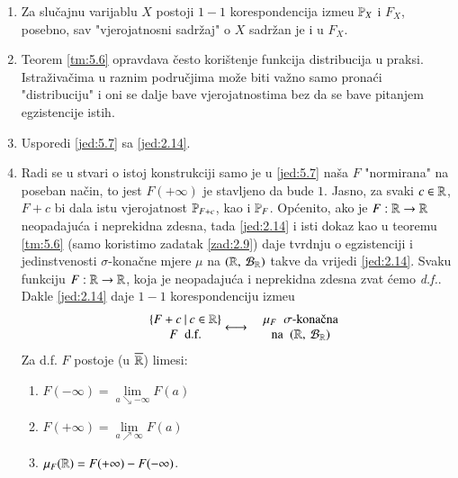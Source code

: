 \begin{nap} \label{nap:5.8}
    \begin{enumerate}[label=(\alph*)]
        \item   \label{nap:5.8a}
        Za slu\v cajnu varijablu $X$ postoji $1-1$ korespondencija izme\dj u $\mathbb{P}_X$ i $F_X$, posebno, sav "vjerojatnosni sadr\v zaj" o $X$ sadr\v zan je i u $F_X$.
        \item Teorem \ref{tm:5.6} opravdava \v cesto kori\v stenje funkcija distribucija u praksi.
        Istra\v ziva\v cima u raznim podru\v cjima mo\v ze biti va\v zno samo prona\' ci "distribuciju" i oni se dalje bave vjerojatnostima bez da se bave pitanjem egzistencije istih.
        \item Usporedi \eqref{jed:5.7} sa \eqref{jed:2.14}.
        \item Radi se u stvari o istoj konstrukciji samo je u \eqref{jed:5.7} na\v sa $F$ "normirana" na poseban na\v cin, to jest $F(+\infty)$ je stavljeno da bude $1$.
        Jasno, za svaki $c \in \mathbb{R}$, $F + c$ bi dala istu vjerojatnost $\mathbb{P}_{F + c}$, kao i $\mathbb{P}_F$.
        Op\' cenito, ako je $F: \mathbb{R} \to \mathbb{R}$ neopadaju\' ca i neprekidna zdesna, tada \eqref{jed:2.14} i isti dokaz kao u teoremu \ref{tm:5.6} (samo koristimo zadatak \ref{zad:2.9}) daje tvrdnju o egzistenciji i jedinstvenosti $\sigma$-kona\v cne mjere $\mu$ na $({\mathbb{R}}, \: {\mathcal{B}_{\mathbb{R}}})$ takve da vrijedi \eqref{jed:2.14}. Svaku funkciju $F : \mathbb{R} \to \mathbb{R}$, koja je neopadaju\' ca i neprekidna zdesna zvat \' cemo \emph{d.f.}.
        Dakle \eqref{jed:2.14} daje $1-1$ korespondenciju izme\dj u
        \begin{equation}    \label{jed:5.9}
            \begin{matrix}
                &\skup{F + c}{c \in \real}\\
                &F \; \textnormal{ d.f.}
            \end{matrix}
            \longleftrightarrow
            \begin{matrix}
                &\mu_F \;\; \sigma \textnormal{-kona\v cna}\\
                &\textnormal{na } \; \urePar{\real}{\borel{\real}}
            \end{matrix}
        \end{equation}
        Za d.f. $F$ postoje (u $\overline{\mathbb{R}}$) limesi:
        \begin{enumerate}[label=]
            \item $F(-\infty) = \lim\limits_{a \searrow -\infty} F(a)$
            \item $F(+\infty) = \lim\limits_{a \nearrow \infty} F(a)$
            \item $\mu_F(\mathbb{R}) = F(+\infty) - F(-\infty)$.
        \end{enumerate}
    \end{enumerate}
\end{nap}

